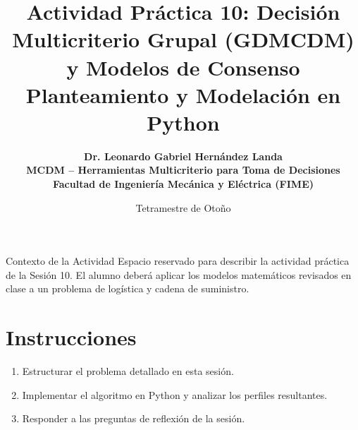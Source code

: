\documentclass[11pt,a4paper]{article}
\title{%
  \sffamily\bfseries\color{UANLblue}%
  Actividad Práctica 10: Decisión Multicriterio Grupal (GDMCDM) y Modelos de Consenso\\
  \large Planteamiento y Modelación en Python
}
\author{%
  \sffamily\bfseries\color{FIMEdarkgray}%
  Dr. Leonardo Gabriel Hernández Landa\\
  \small MCDM -- Herramientas Multicriterio para Toma de Decisiones\\
  \small\color{FIMEgreen}Facultad de Ingeniería Mecánica y Eléctrica (FIME)
}
\date{\sffamily Tetramestre de Otoño}
\begin{document}
\maketitle
\thispagestyle{fancy}

\begin{brandbox}{Contexto de la Actividad}
  Espacio reservado para describir la actividad práctica de la Sesión 10. El alumno deberá aplicar los modelos matemáticos revisados en clase a un problema de logística y cadena de suministro.
\end{brandbox}

\section{Instrucciones}
\begin{enumerate}
    \item Estructurar el problema detallado en esta sesión.
    \item Implementar el algoritmo en Python y analizar los perfiles resultantes.
    \item Responder a las preguntas de reflexión de la sesión.
\end{enumerate}
\end{document}
